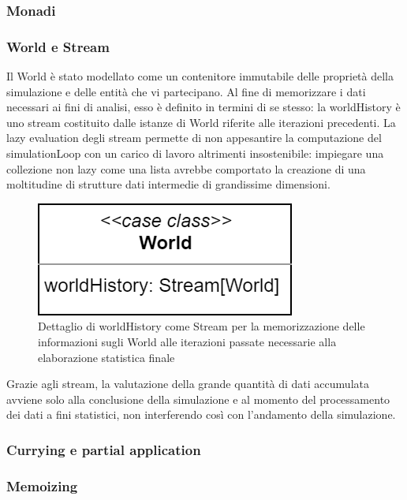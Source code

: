 \subsubsection{Monadi}


\subsubsection{World e Stream}
Il World è stato modellato come un contenitore immutabile delle proprietà della simulazione e delle entità che vi partecipano. Al fine di memorizzare i dati necessari ai fini di analisi, esso è definito in termini di se stesso: la worldHistory è uno stream costituito dalle istanze di World riferite alle iterazioni precedenti. La lazy evaluation degli stream permette di non appesantire la computazione del simulationLoop con un carico di lavoro altrimenti insostenibile: impiegare una collezione non lazy come una lista avrebbe comportato la creazione di una moltitudine di strutture dati intermedie di grandissime dimensioni. 

\begin{figure}[h!]
\centering
\includegraphics[scale=0.30]{img/WorldDetail.png}
\caption{Dettaglio di worldHistory come Stream per la memorizzazione delle informazioni sugli World alle iterazioni passate necessarie alla elaborazione statistica finale}
\label{fig:worldDetail}
\end{figure}

Grazie agli stream, la valutazione della grande quantità di dati accumulata avviene solo alla conclusione della simulazione e al momento del processamento dei dati a fini statistici, non interferendo così con l’andamento della simulazione.

\subsubsection{Currying e partial application}


\subsubsection{Memoizing}



